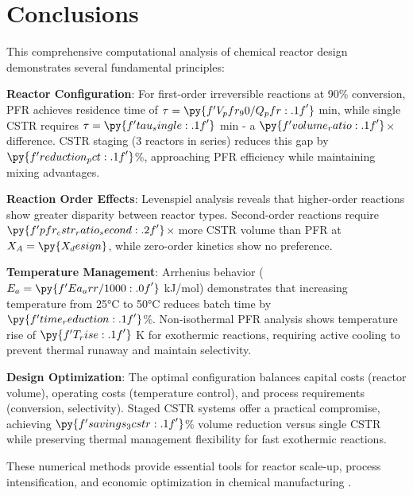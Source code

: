 \documentclass[11pt,a4paper]{article}
\begin{document}
\section{Conclusions}

This comprehensive computational analysis of chemical reactor design demonstrates several fundamental principles:

\textbf{Reactor Configuration}: For first-order irreversible reactions at 90\% conversion, PFR achieves residence time of $\tau = \py{f'{V_pfr_90/Q_pfr:.1f}'}$ min, while single CSTR requires $\tau = \py{f'{tau_single:.1f}'}$ min - a $\py{f'{volume_ratio:.1f}'}$× difference. CSTR staging (3 reactors in series) reduces this gap by $\py{f'{reduction_pct:.1f}'}$\%, approaching PFR efficiency while maintaining mixing advantages.

\textbf{Reaction Order Effects}: Levenspiel analysis reveals that higher-order reactions show greater disparity between reactor types. Second-order reactions require $\py{f'{pfr_cstr_ratio_second:.2f}'}$× more CSTR volume than PFR at $X_A = \py{X_design}$, while zero-order kinetics show no preference.

\textbf{Temperature Management}: Arrhenius behavior ($E_a = \py{f'{Ea_arr/1000:.0f}'}$ kJ/mol) demonstrates that increasing temperature from 25°C to 50°C reduces batch time by $\py{f'{time_reduction:.1f}'}$\%. Non-isothermal PFR analysis shows temperature rise of $\py{f'{T_rise:.1f}'}$ K for exothermic reactions, requiring active cooling to prevent thermal runaway and maintain selectivity.

\textbf{Design Optimization}: The optimal configuration balances capital costs (reactor volume), operating costs (temperature control), and process requirements (conversion, selectivity). Staged CSTR systems offer a practical compromise, achieving $\py{f'{savings_3cstr:.1f}'}$\% volume reduction versus single CSTR while preserving thermal management flexibility for fast exothermic reactions.

These numerical methods provide essential tools for reactor scale-up, process intensification, and economic optimization in chemical manufacturing \cite{Fogler2016, Schmidt2005}.
\end{document}
